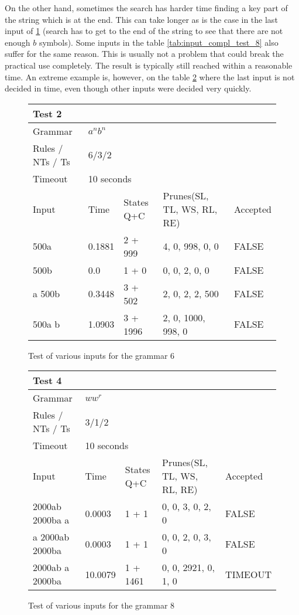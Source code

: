 On the other hand, sometimes the search has harder time finding a key part of the string which is at the end. This can take longer as is the case in the last input of \ref{tab:input_compl_test_2} (search has to get to the end of the string to see that there are not enough $b$ symbols). Some inputs in the table \ref{tab:input_compl_test_8} also suffer for the same reason. This is usually not a problem that could break the practical use completely. The result is typically still reached within a reasonable time. An extreme example is, however, on the table \ref{tab:input_compl_test_4} where the last input is not decided in time, even though other inputs were decided very quickly.

\begin{figure}[h]
\centering
  \caption{Test of various inputs for the grammar 6}
  \label{tab:input_compl_test_2}
\begin{tabular}{ |l|l|l|l|l|  }
  \hline
  \multicolumn{5}{|l|}{Test 2} \\
  \hline
  Grammar & \multicolumn{4}{|l|}{$a^n b^n$} \\
  Rules / NTs / Ts & \multicolumn{4}{|l|}{6/3/2} \\
  Timeout & \multicolumn{4}{|l|}{10 seconds} \\
  \hline
  Input & Time & States Q+C & Prunes(SL, TL, WS, RL, RE) & Accepted \\
  \hline
  500a & 0.1881 & 2 + 999 & 4, 0, 998, 0, 0 & FALSE \\
  500b & 0.0 & 1 + 0 & 0, 0, 2, 0, 0 & FALSE \\
  a 500b & 0.3448 & 3 + 502 & 2, 0, 2, 2, 500 & FALSE \\
  500a b & 1.0903 & 3 + 1996 & 2, 0, 1000, 998, 0  & FALSE \\
  \hline
\end{tabular}
\end{figure}


\begin{figure}[h]
\centering
  \caption{Test of various inputs for the grammar 8}
  \label{tab:input_compl_test_4}
\begin{tabular}{ |l|l|l|l|l|  }
  \hline
  \multicolumn{5}{|l|}{Test 4} \\
  \hline
  Grammar & \multicolumn{4}{|l|}{$w w^r$} \\
  Rules / NTs / Ts & \multicolumn{4}{|l|}{3/1/2} \\
  Timeout & \multicolumn{4}{|l|}{10 seconds} \\
  \hline
  Input & Time & States Q+C & Prunes(SL, TL, WS, RL, RE) & Accepted \\
  \hline
  2000ab 2000ba a & 0.0003 & 1 + 1 & 0, 0, 3, 0, 2, 0 & FALSE \\
  a 2000ab 2000ba &  0.0003 & 1 + 1 & 0, 0, 2, 0, 3, 0 & FALSE \\
  2000ab a 2000ba & 10.0079 & 1 + 1461 & 0, 0, 2921, 0, 1, 0 & TIMEOUT \\
  \hline
\end{tabular}
\end{figure}

